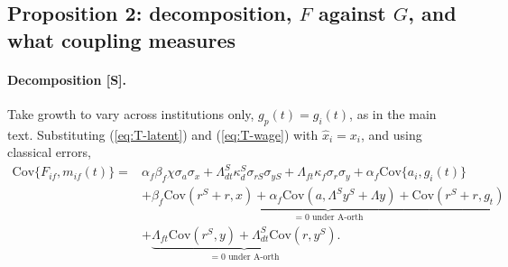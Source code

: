 \documentclass[11pt]{article}
\begin{document}
\subsection{Proposition 2: decomposition, \texorpdfstring{$F$}{F} against \texorpdfstring{$G$}{G}, and what coupling measures}\label{si:theory:decomp}

\paragraph{Decomposition [S].} Take growth to vary across institutions only, $g_p(t)=g_i(t)$, as in the main
text. Substituting (\ref{eq:T-latent}) and (\ref{eq:T-wage}) with $\hat x_i=x_i$, and using classical errors,
\begin{align}
\mathrm{Cov}\{F_{if},m_{if}(t)\}={}&\alpha_f\beta_f\chi\sigma_a\sigma_x+\Lambda^S_{dt}\kappa^S_d\sigma_{rS}\sigma_{yS}
+\Lambda_{ft}\kappa_f\sigma_r\sigma_y+\alpha_f\mathrm{Cov}\{a_i,g_{i}(t)\}\label{eq:T-decomp}\\
&+\underbrace{\beta_f\mathrm{Cov}(r^S+r,x)+\alpha_f\mathrm{Cov}(a,\Lambda^S y^S+\Lambda y)+\mathrm{Cov}(r^S+r,g_t)}_{=0\text{ under A-orth}}\nonumber\\
&+\underbrace{\Lambda_{ft}\mathrm{Cov}(r^S,y)+\Lambda^S_{dt}\mathrm{Cov}(r,y^S)}_{=0\text{ under A-orth}} .\nonumber
\end{align}
\end{document}
